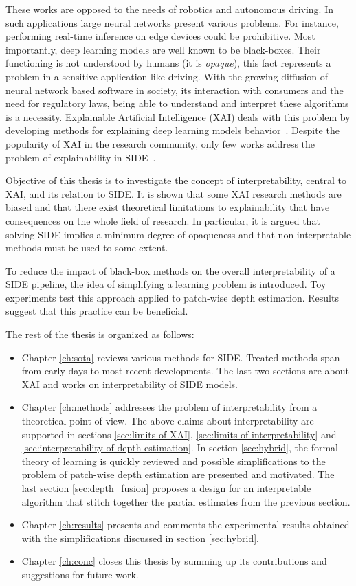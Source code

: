 These works are opposed to the needs of robotics and autonomous driving.
In such applications large neural networks present various problems.
For instance, performing real-time inference on edge devices could be prohibitive.
Most importantly, deep learning models are well known to be black-boxes.
Their functioning is not understood by humans (it is \textit{opaque}), this fact represents a problem in a sensitive application like driving.
With the growing diffusion of neural network based software in society, its interaction with consumers and the need for regulatory laws, being able to understand and interpret these algorithms is a necessity.
Explainable Artificial Intelligence (XAI) deals with this problem by developing methods for explaining deep learning models behavior~\cite{XAI_review}.
Despite the popularity of XAI in the research community, only few works address the problem of explainability in SIDE~\cite{Hu, Dijk, towards_interpretable}.

Objective of this thesis is to investigate the concept of interpretability, central to XAI, and its relation to SIDE.
It is shown that some XAI research methods are biased and that there exist theoretical limitations to explainability that have consequences on the whole field of research.
In particular, it is argued that solving SIDE implies a minimum degree of opaqueness and that non-interpretable methods must be used to some extent.

To reduce the impact of black-box methods on the overall interpretability of a SIDE pipeline, the idea of simplifying a learning problem is introduced.
Toy experiments test this approach applied to patch-wise depth estimation.
Results suggest that this practice can be beneficial.

The rest of the thesis is organized as follows:
\begin{itemize}
    \item{
        Chapter \ref{ch:sota} reviews various methods for SIDE.
        Treated methods span from early days to most recent developments.
        The last two sections are about XAI and works on interpretability of SIDE models.
    }
    \item{
        Chapter \ref{ch:methods} addresses the problem of interpretability from a theoretical point of view.
        The above claims about interpretability are supported in sections \ref{sec:limits of XAI}, \ref{sec:limits of interpretability} and \ref{sec:interpretability of depth estimation}.
        In section \ref{sec:hybrid}, the formal theory of learning is quickly reviewed and possible simplifications to the problem of patch-wise depth estimation are presented and motivated.
        The last section \ref{sec:depth_fusion} proposes a design for an interpretable algorithm that stitch together the partial estimates from the previous section.
    }
    \item{
        Chapter \ref{ch:results} presents and comments the experimental results obtained with the simplifications discussed in section \ref{sec:hybrid}.
    }
    \item{
        Chapter \ref{ch:conc} closes this thesis by summing up its contributions and suggestions for future work.
    }
\end{itemize}